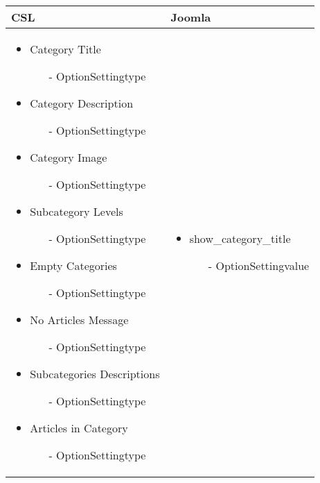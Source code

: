 \begin{minipage}{0.7\textwidth}
\begin{tabular}{|p{} | p{}|}
\hline
\textbf{CSL} & \textbf{Joomla} \\ 
\hline
\begin{itemize}
	\item Category Title 
		\begin{enumerate}
			\item[-] OptionSettingtype
		\end{enumerate} 
	\item Category Description
	\begin{enumerate}
		\item[-] OptionSettingtype
	\end{enumerate}
	\item Category Image
	\begin{enumerate}
		\item[-] OptionSettingtype
	\end{enumerate} 
	\item Subcategory Levels
	\begin{enumerate}
		\item[-] OptionSettingtype
	\end{enumerate} 
	\item Empty Categories
	\begin{enumerate}
			\item[-] OptionSettingtype
	\end{enumerate}
	\item No Articles Message
	\begin{enumerate}
		\item[-] OptionSettingtype
	\end{enumerate} 
	\item Subcategories Descriptions
	\begin{enumerate}
		\item[-] OptionSettingtype
	\end{enumerate}
	\item Articles in Category
	\begin{enumerate}
		\item[-] OptionSettingtype
	\end{enumerate} 
\end{itemize}
 & 
\begin{itemize}
	\item show\_category\_title 
		\begin{enumerate}
			\item[-] OptionSettingvalue

\end{enumerate}
\end{itemize}
\end{tabular}
\end{minipage}

